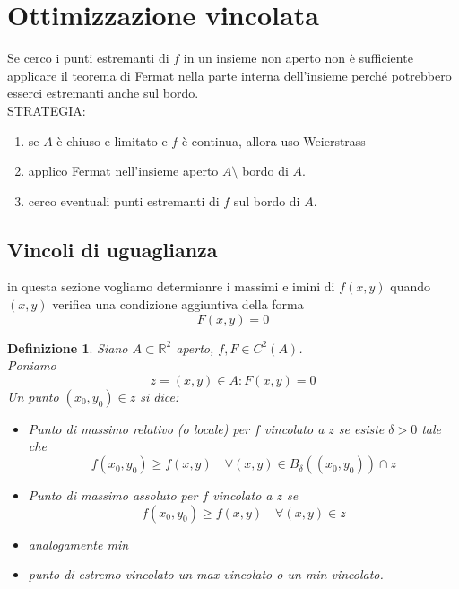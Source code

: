 \documentclass{scrreprt}
\newtheorem{defn}{Definizione}
\newenvironment{definition}{\begin{mdframed}[backgroundcolor=Ivory2]\begin{defn}}{\end{defn}\end{mdframed}}
\begin{document}
\section{Ottimizzazione vincolata}
Se cerco i punti estremanti di $f$ in un insieme non aperto non è sufficiente applicare il teorema di Fermat nella parte interna dell'insieme perché potrebbero esserci estremanti anche sul bordo.\\
STRATEGIA:
\begin{enumerate}
	\item[0] se $A$ è chiuso e limitato e $f$ è continua, allora uso Weierstrass
	\item[1] applico Fermat nell'insieme aperto $A \setminus$ bordo di $A$.
	\item[2] cerco eventuali punti estremanti di $f$ sul bordo di $A$.
\end{enumerate}

\subsection{Vincoli di uguaglianza}
in questa sezione vogliamo determianre i massimi e imini di $f(x,y)$ quando $(x,y)$ verifica una condizione aggiuntiva della forma
\begin{equation}
	F(x,y) = 0
\end{equation}

\begin{definition}
	Siano $A \subset \mathbb{R}^2$ aperto, $f,F \in C^2(A)$.\\
	Poniamo
	\begin{equation}
		z = {(x,y) \in A: F(x,y) = 0}
	\end{equation}
	Un punto $(x_0,y_0) \in z$ si dice:
	\begin{itemize}
		\item Punto di massimo relativo (o locale) per $f$ vincolato a $z$ se esiste $\delta > 0$ tale che
				\begin{equation}
					f(x_0,y_0) \geq f(x,y) \quad \forall (x,y) \in  B_{\delta}((x_0,y_0)) \cap z
				\end{equation}
		\item Punto di massimo assoluto per $f$ vincolato a $z$ se
				\begin{equation}
					f(x_0,y_0) \geq f(x,y) \quad \forall (x,y) \in z
				\end{equation}
		\item analogamente min
		\item punto di estremo vincolato un max vincolato o un min vincolato.
	\end{itemize}
\end{definition}
\end{document}
